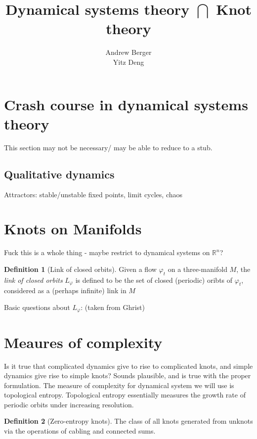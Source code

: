 \documentclass[11pt]{article}
\title{Dynamical systems theory $\bigcap$ Knot theory}
\author{Andrew Berger\\ Yitz Deng}
\newcommand{\R}{\mathbb{R}}
\renewcommand{\phi}{\varphi}
\theoremstyle{plain}
\theoremstyle{definition}
\newtheorem{definition}{Definition}
\begin{document}
\maketitle

\tableofcontents

\section{Crash course in dynamical systems theory}
This section may not be necessary/ may be able to reduce to a stub.

\subsection{Qualitative dynamics}

Attractors: stable/unstable fixed points, limit cycles, chaos


\section{Knots on Manifolds}

Fuck this is a whole thing - maybe restrict to dynamical systems on $\R^n$?


\begin{definition}[Link of closed orbits]
  Given a flow $\phi_t$ on a three-manifold $M$, the \emph{link of closed orbits} $L_\phi$ is defined to be the set of closed (periodic) oribts of $\phi_t$, considered as a (perhaps infinite) link in $M$
\end{definition}

Basic questions about $L_\phi$: (taken from Ghrist)

\section{Meaures of complexity}

Is it true that complicated dynamics give to rise to complicated knots, and simple dynamics give rise to simple knots? Sounds plausible, and is true with the proper formulation.
The measure of complexity for dynamical system we will use is topological entropy. Topological entropy essentially measures the growth rate of periodic orbits under increasing resolution.

\begin{definition}[Zero-entropy knots]
  The class of all knots generated from unknots via the operations of cabling and connected sums.
\end{definition}
\end{document}
